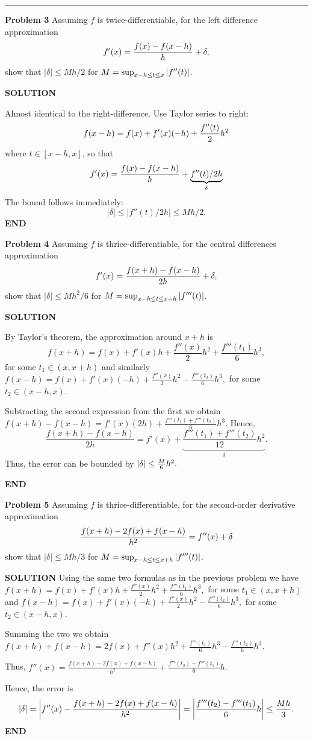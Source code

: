 \documentclass[12pt,a4paper]{article}
\begin{document}
\rule{\textwidth}{1pt}
\textbf{Problem 3} Assuming $f$ is twice-differentiable, for the left difference approximation
\[
f'(x) = {f(x) - f(x - h) \over h} + \ensuremath{\delta},
\]
show that $|\ensuremath{\delta}| \ensuremath{\leq} Mh/2$ for $M = \sup_{x-h \leq t \leq x}\left|{f''(t)}\right|$.

\textbf{SOLUTION}

Almost identical to the right-difference. Use Taylor series to right:
\[
f(x-h) = f(x) + f'(x) (-h) + {f''(t) \over 2} h^2
\]
where $t \ensuremath{\in} [x-h,x]$, so that
\[
f'(x) = {f(x) - f(x-h) \over h} + \underbrace{f''(t)/2 h}_\ensuremath{\delta}
\]
The bound follows immediately:
\[
|\ensuremath{\delta}| \ensuremath{\leq} |f''(t)/2 h| \ensuremath{\leq} Mh/2.
\]
\textbf{END}

\textbf{Problem 4} Assuming $f$ is thrice-differentiable, for the central differences approximation
\[
f'(x) = {f(x + h) - f(x - h) \over 2h} + \ensuremath{\delta},
\]
show that $|\ensuremath{\delta}| \ensuremath{\leq} Mh^2/6$ for $M = \sup_{x-h \leq t \leq x+h}\left|{f'''(t)}\right|$.

\textbf{SOLUTION}

By Taylor's theorem, the approximation around $x+h$ is
\[
f(x+h) = f(x) + f'(x)h + \frac{f''(x)}{2}h^2 + \frac{f'''(t_1)}{6}h^3,
\]
for some $t_1 \ensuremath{\in} (x, x+h)$ and similarly $f(x-h) = f(x) + f'(x)(-h) + \frac{f''(x)}{2}h^2 - \frac{f'''(t_2)}{6}h^3,$ for some $t_2 \ensuremath{\in} (x-h, x)$.

Subtracting the second expression from the first we obtain $f(x+h)-f(x-h) = f'(x)(2h) + \frac{f'''(t_1)+f'''(t_2)}{6}h^3.$ Hence,
\[
\frac{f(x+h)-f(x-h)}{2h} = f'(x)  + \underbrace{\frac{f'''(t_1)+f'''(t_2)}{12}h^2}_{\ensuremath{\delta}}.
\]
Thus, the error can be bounded by $\left|\ensuremath{\delta}\right| \ensuremath{\leq} {M \over 6} h^2.$

\textbf{END}

\textbf{Problem 5}  Assuming $f$ is thrice-differentiable, for the second-order derivative approximation
\[
{f(x+h) - 2f(x) + f(x-h) \over h^2} = f''(x) + \ensuremath{\delta}
\]
show that $|\ensuremath{\delta}| \ensuremath{\leq} Mh/3$ for $M = \sup_{x-h \leq t \leq x+h}\left|{f'''(t)}\right|$.

\textbf{SOLUTION} Using the same two formulas as in the previous problem we have $f(x+h) = f(x) + f'(x)h + \frac{f''(x)}{2}h^2 + \frac{f'''(t_1)}{6}h^3,$ for some $t_1 \ensuremath{\in} (x, x+h)$ and $f(x-h) = f(x) + f'(x)(-h) + \frac{f''(x)}{2}h^2 - \frac{f'''(t_2)}{6}h^3,$ for some $t_2 \ensuremath{\in} (x-h, x)$.

Summing the two we obtain $f(x+h) + f(x-h) = 2f(x) + f''(x)h^2 + \frac{f'''(t_1)}{6}h^3 - \frac{f'''(t_2)}{6}h^3.$

Thus, $f''(x) = \frac{f(x+h) - 2f(x) + f(x-h)}{h^2} + \frac{f'''(t_2) - f'''(t_1)}{6}h.$

Hence, the error is
\[
|\ensuremath{\delta}| = \left|f''(x) - {f(x+h) - 2f(x) + f(x-h) \over h^2} \right| = \left|\frac{f'''(t_2) - f'''(t_1)}{6}h\right|\ensuremath{\leq} {Mh \over 3}.
\]
\textbf{END}
\end{document}
